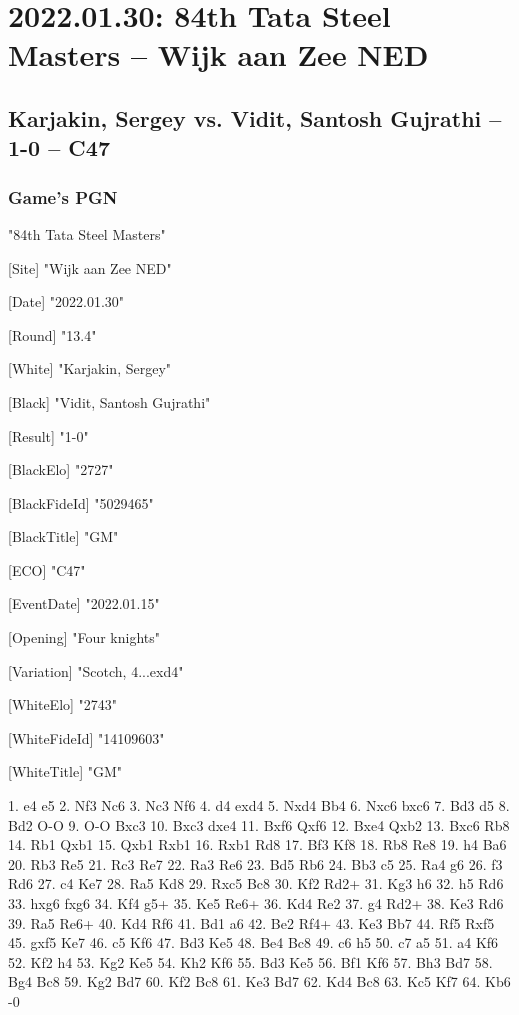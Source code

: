 \documentclass[9pt]{extarticle}
\begin{document}
\section*{2022.01.30: 84th Tata Steel Masters -- Wijk aan Zee NED}

\subsection*{Karjakin, Sergey vs. Vidit, Santosh Gujrathi -- 1-0 -- C47}
\subsubsection*{Game's PGN}
\begin{flushleft}
[Event] "84th Tata Steel Masters"

[Site] "Wijk aan Zee NED"

[Date] "2022.01.30"

[Round] "13.4"

[White] "Karjakin, Sergey"

[Black] "Vidit, Santosh Gujrathi"

[Result] "1-0"

[BlackElo] "2727"

[BlackFideId] "5029465"

[BlackTitle] "GM"

[ECO] "C47"

[EventDate] "2022.01.15"

[Opening] "Four knights"

[Variation] "Scotch, 4...exd4"

[WhiteElo] "2743"

[WhiteFideId] "14109603"

[WhiteTitle] "GM"

\end{flushleft}
\begin{flushleft}
1. e4 e5 2. Nf3 Nc6 3. Nc3 Nf6 4. d4 exd4 5. Nxd4 Bb4 6. Nxc6 bxc6 7. Bd3 d5 8. Bd2 O-O 9. O-O Bxc3 10. Bxc3 dxe4 11. Bxf6 Qxf6 12. Bxe4 Qxb2 13. Bxc6 Rb8 14. Rb1 Qxb1 15. Qxb1 Rxb1 16. Rxb1 Rd8 17. Bf3 Kf8 18. Rb8 Re8 19. h4 Ba6 20. Rb3 Re5 21. Rc3 Re7 22. Ra3 Re6 23. Bd5 Rb6 24. Bb3 c5 25. Ra4 g6 26. f3 Rd6 27. c4 Ke7 28. Ra5 Kd8 29. Rxc5 Bc8 30. Kf2 Rd2+ 31. Kg3 h6 32. h5 Rd6 33. hxg6 fxg6 34. Kf4 g5+ 35. Ke5 Re6+ 36. Kd4 Re2 37. g4 Rd2+ 38. Ke3 Rd6 39. Ra5 Re6+ 40. Kd4 Rf6 41. Bd1 a6 42. Be2 Rf4+ 43. Ke3 Bb7 44. Rf5 Rxf5 45. gxf5 Ke7 46. c5 Kf6 47. Bd3 Ke5 48. Be4 Bc8 49. c6 h5 50. c7 a5 51. a4 Kf6 52. Kf2 h4 53. Kg2 Ke5 54. Kh2 Kf6 55. Bd3 Ke5 56. Bf1 Kf6 57. Bh3 Bd7 58. Bg4 Bc8 59. Kg2 Bd7 60. Kf2 Bc8 61. Ke3 Bd7 62. Kd4 Bc8 63. Kc5 Kf7 64. Kb6 \quad  {}-0
\end{flushleft}
\end{document}
